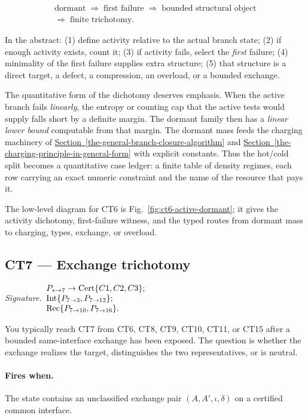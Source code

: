 \documentclass[
  11pt,
]{article}
\theoremstyle{definition}
\newcommand{\secref}[1]{\hyperref[#1]{Section~\ref*{#1}}}
\newcommand{\ctsignature}[1]{\par\noindent\emph{Signature.}\ #1\par\medskip}
\newcommand{\ctcert}[1]{\mathrm{Cert}\{#1\}}
\newcommand{\ctint}[1]{\mathrm{Int}\{#1\}}
\newcommand{\ctrec}[1]{\mathrm{Rec}\{#1\}}
\newcommand{\ctpar}[1]{\paragraph{#1.}}
\begin{document}
\[
\begin{gathered}
\text{dormant}
\;\Rightarrow\;
\text{first failure}
\;\Rightarrow\;
\text{bounded structural object}\\
\Rightarrow\;
\text{finite trichotomy}.
\end{gathered}
\]

In the abstract: (1) define activity relative to the actual branch
state; (2) if enough activity exists, count it; (3) if activity fails,
select the \emph{first} failure; (4) minimality of the first failure
supplies extra structure; (5) that structure is a direct target, a
defect, a compression, an overload, or a bounded exchange.

The quantitative form of the dichotomy deserves emphasis. When the
active branch fails \emph{linearly}, the entropy or counting cap that
the active tests would supply falls short by a definite margin. The
dormant family then has a \emph{linear lower bound} computable from that
margin. The dormant mass feeds the charging machinery of \secref{the-general-branch-closure-algorithm} and
\secref{the-charging-principle-in-general-form} with explicit constants. Thus the hot/cold split becomes a
quantitative case ledger: a finite table of density regimes, each row
carrying an exact numeric constraint and the name of the resource that
pays it.

The low-level diagram for CT6 is Fig.~\ref{fig:ct6-active-dormant};
it gives the activity dichotomy, first-failure witness, and the typed
routes from dormant mass to charging, types, exchange, or overload.



\subsection{CT7 --- Exchange trichotomy}\label{ct:7}\label{the-exchange-trichotomy}
\ctsignature{\(\begin{array}{@{}l@{}}
P_{\ast\to7}\to \ctcert{C1,C2,C3};\\
\ctint{P_{7\to3},P_{7\to12}};\\
\ctrec{P_{7\to10},P_{7\to16}}.
\end{array}\)}

You typically reach CT7 from CT6, CT8, CT9, CT10, CT11, or CT15 after a
bounded same-interface exchange has been exposed.  The question is
whether the exchange realizes the target, distinguishes the two
representatives, or is neutral.

\ctpar{Fires when}
The state contains an unclassified exchange pair
\((A,A',\iota,\delta)\) on a certified common interface.
\end{document}
